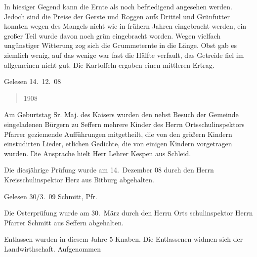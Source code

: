 

\pstart
In hiesiger Gegend kann die Ernte als noch befriedigend angesehen\ob
werden. Jedoch sind die Preise der Gerste und Roggen aufs\unsicher\ob
Drittel\unsicher{} und Grünfutter konnten wegen des Mangels nicht wie in\ob
frühern Jahren eingebracht werden, ein großer Teil wurde davon\ob
noch grün\unsicher{} eingebracht\unsicher{} worden. Wegen vielfach ungünstiger\ob
Witterung zog sich die Grummeternte in die Länge. Obst gab es\ob
ziemlich wenig, auf\unsicher{} das\unsicher{} wenige war fast die Hälfte verfault\unsicher, das\ob
Getreide\unsicher{} fiel im allgemeinen nicht\unsicher{} gut\unsicher. Die Kartoffeln ergaben\ob
einen mittleren Ertrag.

Gelesen 14.\ 12.\ 08

\pend
\begin{verse}
1908
\end{verse}
\pstart

\pend
{}
\pstart

Am Geburtstag Sr. Maj. des Kaisers wurden den\ob
nebst Besuch der Gemeinde eingeladenen Bürgern zu\ob
Seffern mehrere Kinder des Herrn Ortsschulinspektors Pfarrer\unsicher\ob
geziemende Aufführungen mitgetheilt, die von den größern\ob
Kindern einstudirten Lieder\unsicher, etlichen Gedichte, die von einigen\ob
Kindern vorgetragen wurden. Die Ansprache hielt\ob
Herr\unsicher{} Lehrer Kespen\unsicher{} aus Schleid.

\pend
{}
\pstart

Die diesjährige Prüfung wurde am 14.\ Dezember 08 durch\ob
den Herrn Kreisschulinspektor Herz aus Bitburg abgehalten.

Gelesen 30/3.\ 09
Schmitt, Pfr.

\pend
{}
\pstart

Die Osterprüfung wurde am 30.\ März durch den Herrn Orts\ohb
schulinspektor Herrn Pfarrer Schmitt aus Seffern abgehalten.

\pend
{}
\pstart

Entlassen wurden in diesem Jahre 5 Knaben. Die\ob
Entlassenen widmen sich der Landwirthschaft. Aufgenommen\unsicher
\pend
